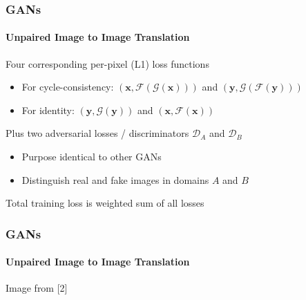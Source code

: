 \documentclass[xetex,professionalfont]{beamer}
\renewcommand{\vec}[1]{\ensuremath{\mathbf{#1}}}
\newcommand{\vx}{\vec{x}}
\newcommand{\vy}{\vec{y}}
\newcommand{\cD}{\mathcal{D}}
\newcommand{\cG}{\mathcal{G}}
\newcommand{\cF}{\mathcal{F}}
\begin{document}
\begin{frame}
	\frametitle{GANs}
	\framesubtitle{Unpaired Image to Image Translation}

	Four corresponding per-pixel (L1) loss functions
	\begin{itemize}
		\item For cycle-consistency: $(\vx,\cF(\cG(\vx)))$ and $(\vy,\cG(\cF(\vy)))$
		\item For identity: $(\vy,\cG(\vy))$ and $(\vx,\cF(\vx))$
	\end{itemize}

	\bigskip

	Plus two adversarial losses / discriminators $\cD_A$ and $\cD_B$
	\begin{itemize}
		\item Purpose identical to other GANs
		\item Distinguish real and fake images in domains $A$ and $B$
	\end{itemize}

	\bigskip

	Total training loss is weighted sum of all losses

\end{frame}


\begin{frame}
	\frametitle{GANs}
	\framesubtitle{Unpaired Image to Image Translation}

	\begin{center}
		{\centering Image from [2]}
	\end{center}

\end{frame}
\end{document}
